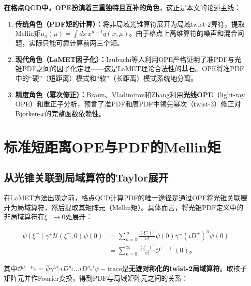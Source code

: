 \documentclass[12pt,a4paper]{ctexart}
\theoremstyle{definition}
\begin{document}
\textbf{在格点QCD中，OPE扮演着三重独特且互补的角色}，这正是本文的论述主线：

\begin{enumerate}
    \item \textbf{传统角色（PDF矩的计算）：}将非局域光锥算符展开为局域twist-2算符，提取Mellin矩$a_n(\mu) = \int dx\, x^{n-1} q(x, \mu)$\cite{Ji2013Euclidean}。由于格点上高维算符的噪声和混合问题，实际只能可靠计算前两三个矩。

    \item \textbf{现代角色（LaMET因子化）：}Izubuchi等人\cite{Izubuchi2018}利用OPE严格证明了准PDF与光锥PDF之间的因子化定理——这是LaMET理论合法性的基石。OPE将准PDF中的``硬''（短距离）模式和``软''（长距离）模式系统地分离。

    \item \textbf{精度角色（幂次修正）：}Braun、Vladimirov和Zhang\cite{Braun2019power}利用\textbf{光线OPE}（light-ray OPE）和重正子分析，预言了准PDF和赝PDF中领先幂次（twist-3）修正对Bjorken-$x$的完整函数依赖性。
\end{enumerate}

\section{标准短距离OPE与PDF的Mellin矩}

\subsection{从光锥关联到局域算符的Taylor展开}

在LaMET方法出现之前，格点QCD计算PDF的唯一途径是通过OPE将光锥关联展开为局域算符，然后提取其矩阵元（Mellin矩）。具体而言，将光锥PDF定义中的非局域算符在$\xi^- \to 0$处展开\cite{Ji2013Euclidean}：

\begin{equation}
\begin{aligned}
\bar{\psi}(\xi^-)\gamma^+ \mathcal{U}(\xi^-,0)\psi(0) &= \sum_{n=0}^{\infty} \frac{(\xi^-)^n}{n!} \bar{\psi}(0)\gamma^+ (iD^+)^n \psi(0) \\
&= \sum_{n=0}^{\infty} \frac{(\xi^-)^n}{n!} \mathcal{O}^{+\ldots+}(0)。
\end{aligned}
\label{eq:Taylor_OPE}
\end{equation}

其中$\mathcal{O}^{\mu_1\ldots\mu_n} = \bar{\psi}\gamma^{(\mu_1}iD^{\mu_2}\ldots iD^{\mu_n)}\psi - \text{trace}$是\textbf{无迹对称化的twist-2局域算符}。取核子矩阵元并作Fourier变换，得到PDF与局域矩阵元之间的关系：
\end{document}
